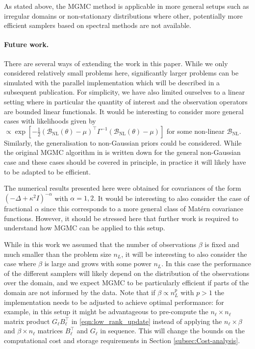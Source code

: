 \documentclass[11pt,english]{article}
\theoremstyle{plain}
\theoremstyle{plain}
\theoremstyle{plain}
\theoremstyle{plain}
\numberwithin{equation}{section}
\newcommand{\rev}[1]{#1}
\begin{document}
\rev{As stated above, the MGMC method is applicable in more general setups such as irregular domains or non-stationary distributions where other, potentially more efficient samplers based on spectral methods are not available.}
\paragraph{Future work.}
There are several ways of extending the work in this paper. While we only considered relatively small problems here, significantly larger problems can be simulated with the parallel implementation which will be described in a subsequent publication. For simplicity, we have also limited ourselves to a linear setting where in particular the quantity of interest and the observation operators are bounded linear functionals. It would be interesting to consider more general cases with likelihoods given by $\propto\exp\left[-\frac{1}{2}(\mathcal{B}_\text{NL}(\theta)-\mu)^\top\Gamma^{-1}(\mathcal{B}_\text{NL}(\theta)-\mu)\right]$ for some non-linear $\mathcal{B}_\text{NL}$. Similarly, the generalisation to non-Gaussian priors could be considered. While the original MGMC algorithm in \cite{goodman1989multigrid} is written down for the general non-Gaussian case and these cases should be covered in principle, in practice it will likely have to be adapted to be efficient.

\rev{The numerical results presented here were obtained for covariances of the form $(-\Delta+\kappa^2 I)^{-\alpha}$ with $\alpha=1,2$. It would be interesting to also consider the case of fractional $\alpha$ since this corresponds to a more general class of Mat\'{e}rn covariance functions. However, it should be stressed here that further work is required to understand how MGMC can be applied to this setup.}

\rev{While in this work we assumed that the number of observations $\beta$ is fixed and much smaller than the problem size $n_L$, it will be interesting to also consider the case where $\beta$ is large and grows with some power $n_L$. In this case the performance of the different samplers will likely depend on the distribution of the observations over the domain, and we expect MGMC to be particularly efficient if parts of the domain are not informed by the data. Note that if $\beta\propto n_L^p$ with $p>1$ the implementation needs to be adjusted to achieve optimal performance: for example, in this setup it might be advantageous to pre-compute the $n_\ell\times n_\ell$ matrix product $G_\ell B_\ell^\top$ in \eqref{eqn:low_rank_update} instead of applying the $n_\ell\times \beta$ and $\beta\times n_\ell$ matrices $B_\ell^\top$ and $G_\ell$ in sequence. This will change the bounds on the computational cost and storage requirements in Section \ref{subsec:Cost-analysis}.}
\end{document}
